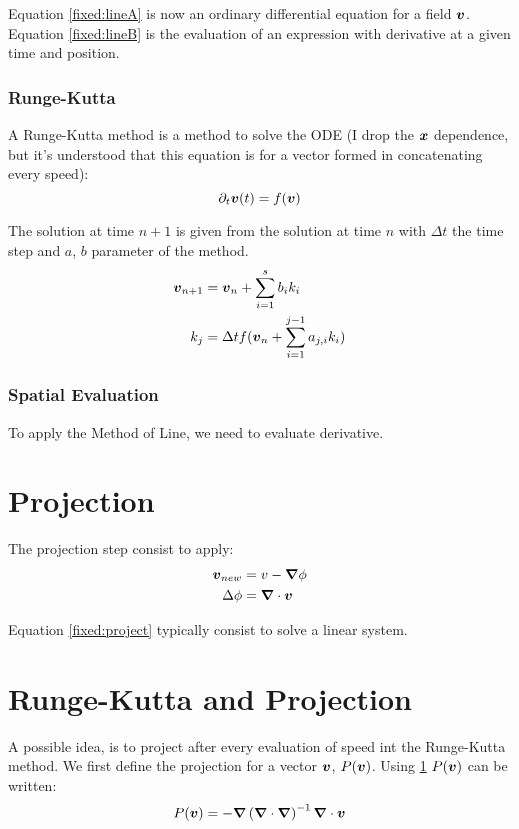Equation \ref{fixed:lineA} is now an ordinary differential equation for a field ${\boldsymbol {v}}$.
Equation \ref{fixed:lineB} is the evaluation of an expression with derivative at a given time and position.

\subsubsection{Runge-Kutta}

A Runge-Kutta method is a method to solve the ODE (I drop the ${\boldsymbol {x}}$ dependence, but it's understood that this equation is for a vector formed in concatenating every speed):
\begin{equation}
\partial_t {\boldsymbol {v}}(t)=f({\boldsymbol {v}})
\end{equation}

The solution at time $n+1$ is given from the solution at time $n$ with $\Delta t$ the time step and $a$, $b$ parameter of the method.
\begin{align*}
	{\boldsymbol {v}}_{n+1}&={\boldsymbol {v}}_{n}+\sum_{i=1}^{s}b_{i}k_{i}\\
	k_{j}&=\Delta t f({\boldsymbol {v}}_{n}+\sum_{i=1}^{j-1}a_{j,i}k_{i})
\end{align*}

\subsubsection{Spatial Evaluation}
To apply the Method of Line, we need to evaluate derivative.

\section{Projection}
\label{fixed:projection}
The projection step consist to apply:
\begin{align}
  {\boldsymbol {v}}_{new}&=v-{\boldsymbol {\nabla}}\phi\\
  \Delta \phi&={\boldsymbol {\nabla}} \cdot {\boldsymbol {v}}\label{fixed:project}
\end{align}

Equation \ref{fixed:project} typically consist to solve a linear system.

\section{Runge-Kutta and Projection}

A possible idea, is to project after every evaluation of speed int the Runge-Kutta method.
We first define the projection for a vector ${\boldsymbol {v}}$, $P({\boldsymbol {v}})$.
Using \ref{fixed:projection} $P({\boldsymbol {v}})$ can be written:
\begin{equation}
  P({\boldsymbol {v}})=-{\boldsymbol {\nabla}}\left({\boldsymbol {\nabla}}\cdot {\boldsymbol {\nabla}}\right)^{-1}{\boldsymbol {\nabla}}\cdot{\boldsymbol {v}}
\end{equation}

